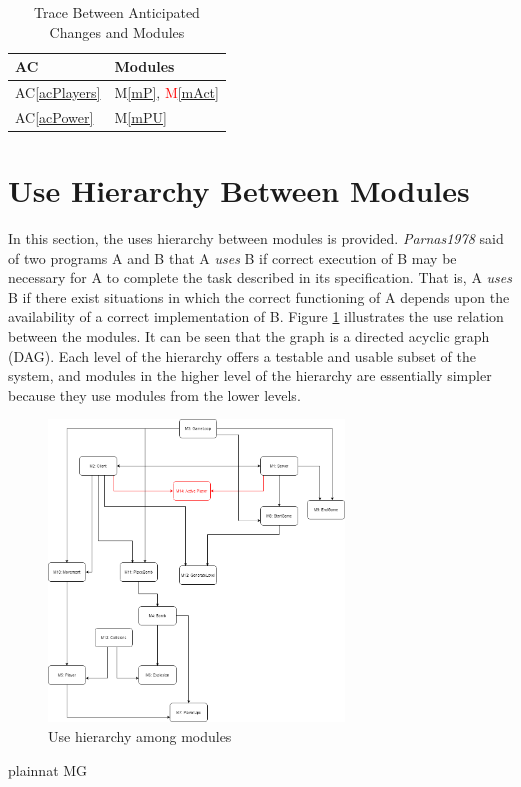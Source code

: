 \documentclass[12pt, titlepage]{article}
\newcommand{\acref}[1]{AC\ref{#1}}
\newcommand{\mref}[1]{M\ref{#1}}
\begin{document}
\begin{table}[H]
\centering
\begin{tabular}{p{} p{}}
\toprule
\textbf{AC} & \textbf{Modules}\\
\midrule
\acref{acPlayers} & \mref{mP}, \textcolor{red}{\mref{mAct}} \\
\acref{acPower} & \mref{mPU}\\
\bottomrule
\end{tabular}
\caption{Trace Between Anticipated Changes and Modules}
\label{TblACT}
\end{table}

\section{Use Hierarchy Between Modules} \label{SecUse}

In this section, the uses hierarchy between modules is
provided. \textit{Parnas1978} said of two programs A and B that A {\em uses} B if
correct execution of B may be necessary for A to complete the task described in
its specification. That is, A {\em uses} B if there exist situations in which
the correct functioning of A depends upon the availability of a correct
implementation of B.  Figure \ref{FigUH} illustrates the use relation between
the modules. It can be seen that the graph is a directed acyclic graph
(DAG). Each level of the hierarchy offers a testable and usable subset of the
system, and modules in the higher level of the hierarchy are essentially simpler
because they use modules from the lower levels.

\begin{figure}[H]
\centering
\includegraphics[width=0.7\textwidth]{UsesHierarchy.png}
\caption{Use hierarchy among modules}
\label{FigUH}
\end{figure}


 {plainnat}
 {MG}
\end{document}
